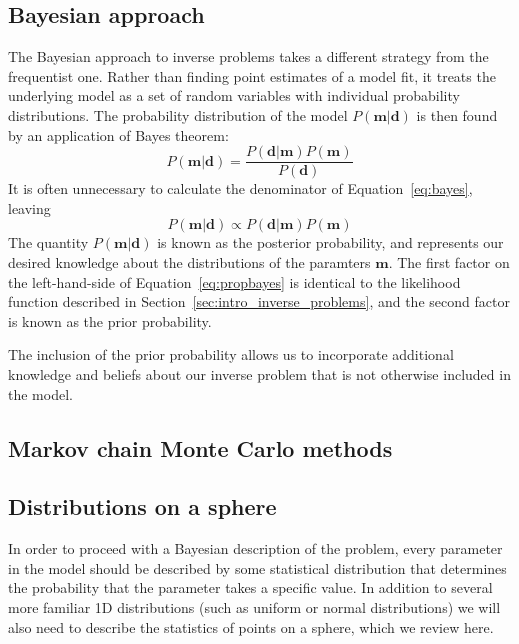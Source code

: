 \documentclass[preprint,12pt,authoryear]{elsarticle}
\begin{document}
\subsection{Bayesian approach}

The Bayesian approach to inverse problems takes a different strategy from the frequentist one.
Rather than finding point estimates of a model fit, it treats the underlying model
as a set of random variables with individual probability distributions.
The probability distribution of the model $P(\mathbf{m} \vert \mathbf{d})$ 
is then found by an application of Bayes theorem:
\begin{equation}
P\left(\mathbf{m} \vert \mathbf{d} \right) = \frac{ P \left(\mathbf{d}\vert \mathbf{m} \right) P \left( \mathbf{m} \right) }{P \left( \mathbf{d}\right)}
\label{eq:bayes}
\end{equation}
It is often unnecessary to calculate the denominator of Equation~\eqref{eq:bayes}, leaving
\begin{equation}
P\left(\mathbf{m} \vert \mathbf{d} \right) \propto P \left( \mathbf{d} \vert \mathbf{m} \right) P \left( \mathbf{m} \right) 
\label{eq:propbayes}
\end{equation}
The quantity $P(\mathbf{m} \vert \mathbf{d})$ is known as the posterior probability,
and represents our desired knowledge about the distributions of the paramters $\mathbf{m}$.
The first factor on the left-hand-side of Equation~\eqref{eq:propbayes} is identical to the likelihood
function described in Section~\ref{sec:intro_inverse_problems}, and the second factor
is known as the prior probability.

The inclusion of the prior probability allows us to incorporate additional knowledge
and beliefs about our inverse problem that is not otherwise included in the model.

\subsection{Markov chain Monte Carlo methods}


\subsection{Distributions on a sphere}

In order to proceed with a Bayesian description of the problem, every parameter
in the model should be described by some statistical distribution that determines
the probability that the parameter takes a specific value.
In addition to several more familiar 1D distributions (such as uniform or normal distributions)
we will also need to describe the statistics of points on a sphere, which we 
review here.
\end{document}
